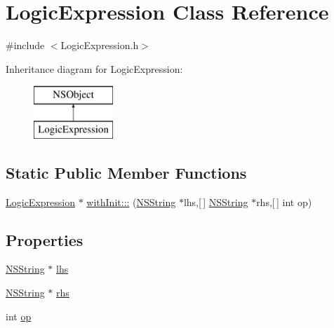 \hypertarget{interface_logic_expression}{
\section{\-Logic\-Expression \-Class \-Reference}
\label{interface_logic_expression}
}


{\ttfamily \#include $<$\-Logic\-Expression.\-h$>$}

\-Inheritance diagram for \-Logic\-Expression\-:\begin{figure}[H]
\begin{center}
\leavevmode
\includegraphics[height=2.000000cm]{interface_logic_expression}
\end{center}
\end{figure}
\subsection*{\-Static \-Public \-Member \-Functions}
\begin{DoxyCompactItemize}
\item 
\hyperlink{interface_logic_expression}{\-Logic\-Expression} $\ast$ \hyperlink{interface_logic_expression_a6f3209be5aea5aced08820a308643e9d}{with\-Init\-:::} (\hyperlink{class_n_s_string}{\-N\-S\-String} $\ast$lhs,\mbox{[}$\,$\mbox{]} \hyperlink{class_n_s_string}{\-N\-S\-String} $\ast$rhs,\mbox{[}$\,$\mbox{]} int op)
\end{DoxyCompactItemize}
\subsection*{\-Properties}
\begin{DoxyCompactItemize}
\item 
\hyperlink{class_n_s_string}{\-N\-S\-String} $\ast$ \hyperlink{interface_logic_expression_ac71111153d59f489e49e08671269d75c}{lhs}
\item 
\hyperlink{class_n_s_string}{\-N\-S\-String} $\ast$ \hyperlink{interface_logic_expression_a5cc866390f4e5dbe2a2333b59f029f50}{rhs}
\item 
int \hyperlink{interface_logic_expression_a5246e5c685edbc060526dbb81a469916}{op}
\end{DoxyCompactItemize}


